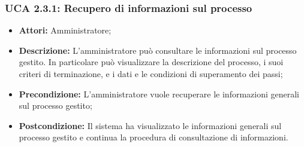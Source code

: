 \hypertarget{A2.3.1}{}
\subsubsection{UCA 2.3.1: Recupero di informazioni sul processo}
\begin{itemize}
\item \textbf{Attori:}
Amministratore;
\item \textbf{Descrizione:}
L'amministratore può consultare le informazioni sul processo gestito. In particolare può visualizzare la descrizione del processo, i suoi criteri di terminazione, e i dati e le condizioni di superamento dei passi;
\item \textbf{Precondizione:}
L'amministratore vuole recuperare le informazioni generali sul processo gestito;
\item \textbf{Postcondizione:}
Il sistema ha visualizzato le informazioni generali sul processo gestito e continua la procedura di consultazione di informazioni.
\end{itemize}

\hypertarget{A2.3.2}{}
